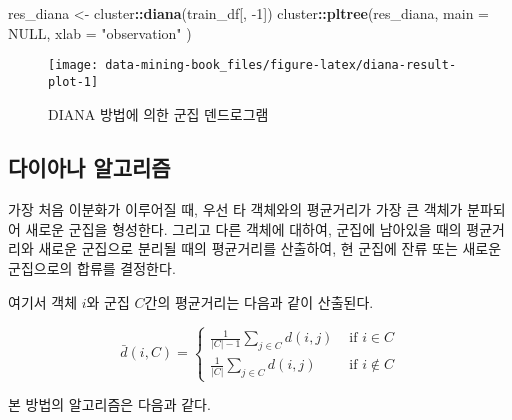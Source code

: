 \documentclass[]{book}
\newenvironment{Shaded}{\begin{snugshade}}{\end{snugshade}}
\newcommand{\DataTypeTok}[1]{\textcolor[rgb]{0.13,0.29,0.53}{#1}}
\newcommand{\DecValTok}[1]{\textcolor[rgb]{0.00,0.00,0.81}{#1}}
\newcommand{\KeywordTok}[1]{\textcolor[rgb]{0.13,0.29,0.53}{\textbf{#1}}}
\newcommand{\NormalTok}[1]{#1}
\newcommand{\OperatorTok}[1]{\textcolor[rgb]{0.81,0.36,0.00}{\textbf{#1}}}
\newcommand{\OtherTok}[1]{\textcolor[rgb]{0.56,0.35,0.01}{#1}}
\newcommand{\StringTok}[1]{\textcolor[rgb]{0.31,0.60,0.02}{#1}}
\begin{document}
\begin{Shaded}
\begin{Highlighting}[]
\NormalTok{res_diana <-}\StringTok{ }\NormalTok{cluster}\OperatorTok{::}\KeywordTok{diana}\NormalTok{(train_df[, }\DecValTok{-1}\NormalTok{])}
\NormalTok{cluster}\OperatorTok{::}\KeywordTok{pltree}\NormalTok{(res_diana,}
                \DataTypeTok{main =} \OtherTok{NULL}\NormalTok{,}
                \DataTypeTok{xlab =} \StringTok{"observation"}
\NormalTok{                )}
\end{Highlighting}
\end{Shaded}

\begin{figure}

{\centering \texttt{[image: data-mining-book\_files/figure-latex/diana-result-plot-1]} 

}

\caption{DIANA 방법에 의한 군집 덴드로그램}\label{fig:diana-result-plot}
\end{figure}

\hypertarget{diana-algorithm}{%
\subsection{다이아나 알고리즘}\label{diana-algorithm}}

가장 처음 이분화가 이루어질 때, 우선 타 객체와의 평균거리가 가장 큰 객체가 분파되어 새로운 군집을 형성한다. 그리고 다른 객체에 대하여, 군집에 남아있을 때의 평균거리와 새로운 군집으로 분리될 때의 평균거리를 산출하여, 현 군집에 잔류 또는 새로운 군집으로의 합류를 결정한다.

여기서 객체 \(i\)와 군집 \(C\)간의 평균거리는 다음과 같이 산출된다.

\begin{equation*}
\bar{d}(i, C) = \begin{cases}
\frac{1}{|C| - 1} \sum_{j \in C} d(i, j) & \text{ if } i \in C\\
\frac{1}{|C|} \sum_{j \in C} d(i, j) & \text{ if } i \notin C
\end{cases}
\end{equation*}

본 방법의 알고리즘은 다음과 같다.
\end{document}
